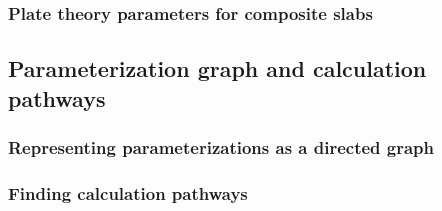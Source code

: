 \documentclass[hess, manuscript]{copernicus}
\begin{document}
\subsubsection{Plate theory parameters for composite slabs}


\subsection{Parameterization graph and calculation pathways}


\subsubsection{Representing parameterizations as a directed graph}




\subsubsection{Finding calculation pathways}

\end{document}
